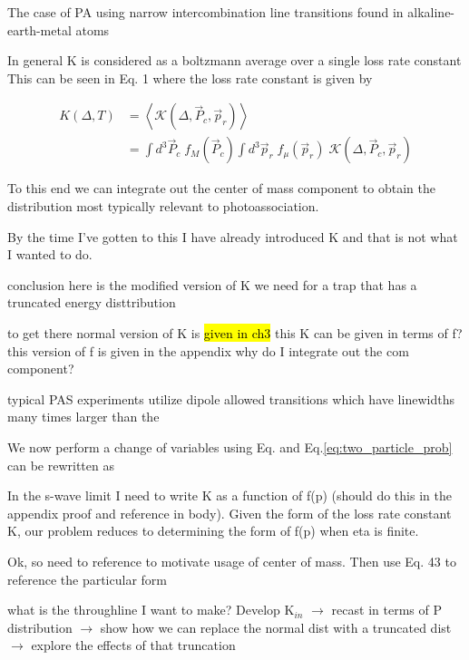 The case of PA using narrow intercombination line transitions found in alkaline-earth-metal atoms 

In general K is considered as a boltzmann average over a single loss rate constant
This can be seen in \cite{Ciuryo2004} Eq. 1 where the loss rate constant is given by

\begin{equation}
\begin{split}
\label{eq:ciuryo04_eq1}
		 K(\Delta,T) &= \left\langle\mathcal{K}(\Delta,\vec{P}_c,\vec{p}_r)\right\rangle \\
		 &= \int d^3\vec{P}_c \; f_M(\vec{P}_c) \int d^3\vec{p}_r \; f_{\mu}(\vec{p}_r) \; \mathcal{K}(\Delta,\vec{P}_c,\vec{p}_r)
\end{split}
\end{equation}


To this end we can integrate out the center of mass component to obtain the distribution most typically relevant to photoassociation.

By the time I've gotten to this I have already introduced K and that is not what I wanted to do. 

conclusion
here is the modified version of K we need for a trap that has a truncated energy disttribution

to get there
normal version of K is \hl{given in ch3}
this K can be given in terms of f? 
this version of f is given in the appendix
	why do I integrate out the com component?

typical PAS experiments utilize dipole allowed transitions which have linewidths many times larger than the 

We now perform a change of variables using Eq. and Eq.\ref{eq:two_particle_prob} can be rewritten as 

In the s-wave limit I need to write K as a function of f(p) (should do this in the appendix proof and reference in body). Given the form of the loss rate constant K, our problem reduces to determining the form of f(p) when eta is finite.

Ok, so need to reference \cite{Ciuryo2004} to motivate usage of center of mass.
Then use \cite{Nicholson2015a} Eq. 43 to reference the particular form 


what is the throughline I want to make? Develop K$_{in}$ $\rightarrow$ recast in terms of P distribution $\rightarrow$ show how we can replace the normal dist with a truncated dist $\rightarrow$ explore the effects of that truncation 


